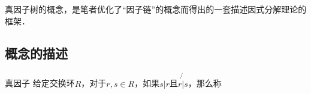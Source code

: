 
真因子树的概念，是笔者优化了“因子链”的概念而得出的一套描述因式分解理论的框架．

\subsection{概念的描述}

\begin{definition}{真因子}
给定交换环$R$，对于$r, s\in R$，如果$s|r$且$r\not{|}s$，那么称
\end{definition}




